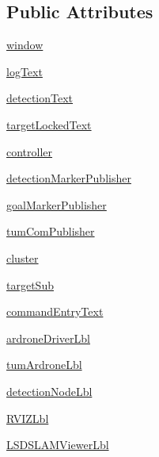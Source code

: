 \subsection*{Public Attributes}
\begin{DoxyCompactItemize}
\item 
\hyperlink{classstaircaseai_1_1staircaseAI_a95e3078cae642f3569ea7ea043cddc3f}{window}
\item 
\hyperlink{classstaircaseai_1_1staircaseAI_a4fe728ac07ff17300ede98396d4516dc}{log\-Text}
\item 
\hyperlink{classstaircaseai_1_1staircaseAI_a69f3626f7e9a387ecf066fc874fb9b15}{detection\-Text}
\item 
\hyperlink{classstaircaseai_1_1staircaseAI_a1f55704fa569f33c5cabd6e89c549dc6}{target\-Locked\-Text}
\item 
\hyperlink{classstaircaseai_1_1staircaseAI_aae321ff5a9a1cffe907c562ba4c6b39f}{controller}
\item 
\hyperlink{classstaircaseai_1_1staircaseAI_a94eefb2cb8d38235945f714fe35b2e5b}{detection\-Marker\-Publisher}
\item 
\hyperlink{classstaircaseai_1_1staircaseAI_ae21365d23660c43e89c13ef633c7fe65}{goal\-Marker\-Publisher}
\item 
\hyperlink{classstaircaseai_1_1staircaseAI_a84126efb40c0a7d59dff2b930ec0a63c}{tum\-Com\-Publisher}
\item 
\hyperlink{classstaircaseai_1_1staircaseAI_ad4b23f2ca76299504bf0ed5492293b10}{cluster}
\item 
\hyperlink{classstaircaseai_1_1staircaseAI_aa94cc788015f2cf55e5e0755b95341fe}{target\-Sub}
\item 
\hyperlink{classstaircaseai_1_1staircaseAI_a2c20eaa6e814025adfe71f11737dd0cf}{command\-Entry\-Text}
\item 
\hyperlink{classstaircaseai_1_1staircaseAI_abe6ce43882cbd5e478493177450c9023}{ardrone\-Driver\-Lbl}
\item 
\hyperlink{classstaircaseai_1_1staircaseAI_a6b07562110670bd39dfaa76c3d289f4c}{tum\-Ardrone\-Lbl}
\item 
\hyperlink{classstaircaseai_1_1staircaseAI_ab2a668e0ee4a8c8eed4982275a34b9f8}{detection\-Node\-Lbl}
\item 
\hyperlink{classstaircaseai_1_1staircaseAI_ae050ef3b610f1f90003f74c89c6562c2}{R\-V\-I\-Z\-Lbl}
\item 
\hyperlink{classstaircaseai_1_1staircaseAI_a027e1496f0f3ecf7be88e2d3986f5bd2}{L\-S\-D\-S\-L\-A\-M\-Viewer\-Lbl}
\item 

\end{DoxyCompactItemize}
